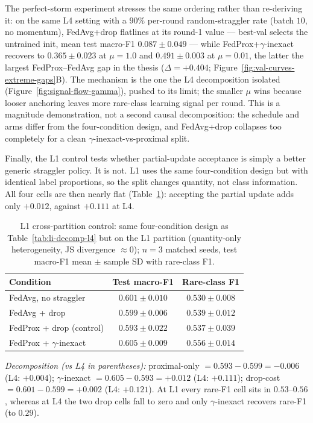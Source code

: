 \documentclass[11pt,a4paper]{report}
\begin{document}
The perfect-storm experiment stresses the same ordering rather than re-deriving
it: on the same L4 setting with a $90\%$ per-round random-straggler rate (batch
$10$, no momentum), FedAvg+drop flatlines at its round-1 value --- best-val
selects the untrained init, mean test macro-F1 $0.087 \pm 0.049$ --- while
FedProx+$\gamma$-inexact recovers to $0.365 \pm 0.023$ at $\mu = 1.0$ and
$0.491 \pm 0.003$ at $\mu = 0.01$, the latter the largest FedProx--FedAvg gap in
the thesis ($\Delta = +0.404$; Figure~\ref{fig:val-curves-extreme-gaps}B). The
mechanism is the one the L4 decomposition isolated (Figure~\ref{fig:signal-flow-gamma}),
pushed to its limit; the smaller $\mu$ wins because looser anchoring leaves more
rare-class learning signal per round. This is a magnitude demonstration, not a
second causal decomposition: the schedule and arms differ from the four-condition
design, and FedAvg+drop collapses too completely for a clean
$\gamma$-inexact-vs-proximal split.

Finally, the L1 control tests whether partial-update acceptance is simply a better
generic straggler policy. It is not. L1 uses the same four-condition design but with
identical label proportions, so the split changes quantity, not class information.
All four cells are then nearly flat (Table~\ref{tab:li-decomp-l1}): accepting the
partial update adds only $+0.012$, against $+0.111$ at L4.

\begin{table}[H]
\centering
\caption{L1 cross-partition control: same four-condition design as
Table~\ref{tab:li-decomp-l4} but on the L1 partition (quantity-only
heterogeneity, JS divergence $\approx 0$); $n=3$ matched seeds, test
macro-F1 mean $\pm$ sample SD with rare-class F1.}
\label{tab:li-decomp-l1}
\small
\begin{tabular}{lcc}
\toprule
Condition                                       & Test macro-F1        & Rare-class F1 \\
\midrule
FedAvg, no straggler                            & $0.601 \pm 0.010$    & $0.530 \pm 0.008$ \\
FedAvg + drop                                   & $0.599 \pm 0.006$    & $0.539 \pm 0.012$ \\
FedProx + drop (control)                        & $0.593 \pm 0.022$    & $0.537 \pm 0.039$ \\
FedProx + $\gamma$-inexact                      & $0.605 \pm 0.009$    & $0.556 \pm 0.014$ \\
\bottomrule
\end{tabular}

\smallskip
\noindent\textit{Decomposition (vs L4 in parentheses):}
proximal-only $= 0.593 - 0.599 = -0.006$ (L4: $+0.004$);
$\gamma$-inexact $= 0.605 - 0.593 = +0.012$ (L4: $+0.111$);
drop-cost $= 0.601 - 0.599 = +0.002$ (L4: $+0.121$). At L1 every rare-F1
cell sits in $0.53$--$0.56$, whereas at L4 the two drop cells fall to zero
and only $\gamma$-inexact recovers rare-F1 (to $0.29$).
\end{table}
\end{document}
